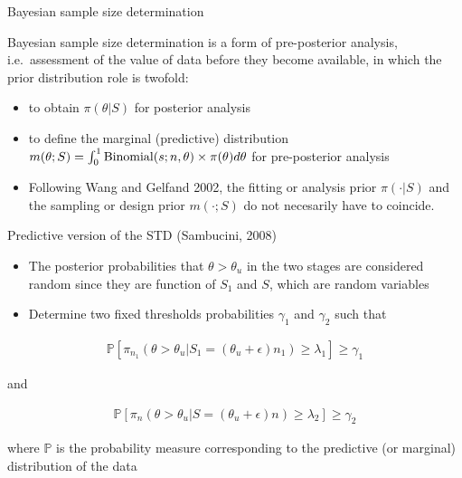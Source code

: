 \documentclass{beamer}
\begin{document}
\begin{frame}{Bayesian sample size determination}

Bayesian sample size determination is a form of pre-posterior analysis,
i.e.~assessment of the value of data before they become available, in
which the prior distribution role is twofold:

\begin{itemize}
\item
  to obtain \(\pi(\theta\vert S)\) for posterior analysis
\item
  to define the marginal (predictive) distribution
  \(m(\theta; S)=\int_{0}^{1}{\rm Binomial}(s; n, \theta)\times \pi(\theta) d\theta\)
  for pre-posterior analysis
\item
  Following Wang and Gelfand 2002, the fitting or analysis prior
  \(\pi(\cdot\vert S)\) and the sampling or design prior \(m(\cdot;S)\) do
  not necesarily have to coincide.
\end{itemize}

\end{frame}


\begin{frame}{Predictive version of the STD (Sambucini, 2008)}

\begin{itemize}
\item
  The posterior probabilities that \(\theta>\theta_u\) in the two stages
  are considered random since they are function of \(S_1\) and \(S\),
  which are random variables
\item
  Determine two fixed thresholds probabilities \(\gamma_1\) and
  \(\gamma_2\) such that
\end{itemize}


\begin{align}
\mathbb{P}\left[\pi_{n_1}(\theta >\theta_u \vert S_1=(\theta_u+\epsilon)n_1)\geq\lambda_1\right]\geq\gamma_1
\end{align}


and

\begin{align}
\mathbb{P}\left[\pi_n(\theta>\theta_u\vert S=(\theta_u+\epsilon)n)\geq\lambda_2\right]\geq\gamma_2
\end{align}


where \(\mathbb{P}\) is the probability measure corresponding to the
predictive (or marginal) distribution of the data

\end{frame}
\end{document}

